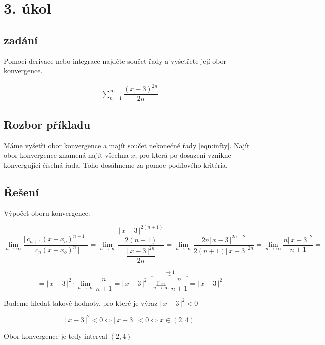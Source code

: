 \section{3. úkol}
\subsection*{zadání}
Pomocí derivace nebo integrace najděte součet řady a vyšetřete její obor konvergence.

\begin{eqnarray}
\sum\limits_{n=1}^\infty \dfrac{(x-3)^{2n}}{2n} \label{eqn:infty}
\end{eqnarray}


\subsection*{Rozbor příkladu}
Máme vyšetři obor konvergence a majít součet nekonečné řady \ref{eqn:infty}. Najít obor konvergence znamená najít všechna $x$, pro která po dosazení vznikne konvergující číselná řada. Toho dosáhneme za pomoc podílového kritéria.

\subsection*{Řešení}
Výpočet oboru konvergence:

\begin{displaymath}
\lim_{n \rightarrow \infty} \dfrac{\big |\,c_{n+1}(x - x_o)^{n + 1}\,\big |}{\big | \,c_n(x - x_o)^{n} \, \big |} = 
\lim_{n \rightarrow \infty}  \dfrac{\dfrac{\big |\,x - 3\, \big|^{2(n+1)}}{2(n+1)}}{\dfrac{\big | \, x-3\, \big |^{2n}}{2n}} =
\lim_{n \rightarrow \infty} \dfrac{2n \big |\,x-3\,\big |^{2n+2}}{2(n+1)\big |\,x-3\,\big |^{2n}} = 
\lim_{n \rightarrow \infty}  \frac{n\big |\,x-3\,\big |^{2}}{n+1} = 
\end{displaymath}

\begin{displaymath}
= \big |\,x-3\,\big |^{2}\cdot\lim_{n \rightarrow \infty}  \frac{n}{n+1} =
\big |\,x-3\,\big |^{2}\cdot\overbrace{\lim_{n \rightarrow \infty}  \frac{n}{n+1}}^{\rightarrow 1} = \big |\,x-3\,\big |^{2}
\end{displaymath}
\vspace{18px}

\noindent Budeme hledat takové hodnoty, pro které je výraz $\big |\,x-3\,\big |^{2} < 0$

\begin{displaymath}
\big |\,x-3\,\big |^{2} < 0\Leftrightarrow \big |\,x-3\,\big | < 0 \Leftrightarrow x \in (2, 4)
\end{displaymath}

\noindent Obor konvergence je tedy interval $(2, 4)$

